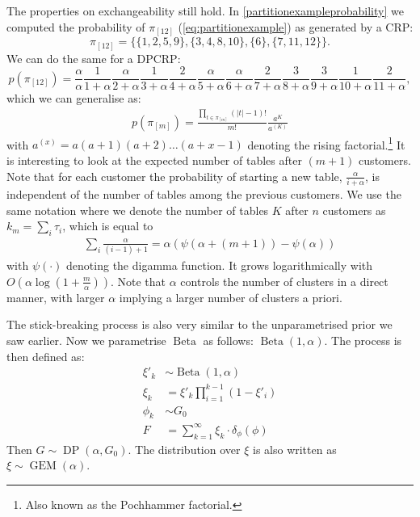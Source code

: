 The properties on exchangeability still hold. In \cref{partitionexampleprobability} we computed the probability of $\pi_{[12]}$ (\cref{eq:partitionexample}) as generated by a CRP:
\begin{equation}
	\pi_{[12]} = \{\{1,2,5,9\},\{3,4,8,10\},\{6\},\{7,11,12\}\}.
\end{equation}
We can do the same for a DPCRP:
\begin{equation}\label{eq:dppartitionexampleprobability}
	p(\pi_{[12]}) = \frac{\alpha}{\alpha}\frac{1}{1+\alpha}\frac{\alpha}{2+\alpha}\frac{1}{3+\alpha}\frac{2}{4+\alpha}\frac{\alpha}{5+\alpha}\frac{\alpha}{6+\alpha}\frac{2}{7+\alpha}\frac{3}{8+\alpha}\frac{3}{9+\alpha}\frac{1}{10+\alpha}\frac{2}{11+\alpha},
\end{equation}
which we can generalise as:
\begin{align}
	p(\pi_{[m]}) = \frac{\prod_{t\in\pi_{[m]}}(|t|-1)!}{m!} \frac{a^K}{a^{(K)}}
\end{align}
with $a^{(x)} = a(a+1)(a+2)\ldots(a+x-1)$ denoting the rising factorial.\footnote{Also known as the Pochhammer factorial.} It is interesting to look at the expected number of tables after $(m+1)$ customers. Note that for each customer the probability of starting a new table, $\frac{\alpha}{i+\alpha}$, is independent of the number of tables among the previous customers. We use the same notation where we denote the number of tables $K$ after $n$ customers as $k_m = \sum_i \tau_i$, which is equal to
\begin{align}
	\sum_i \frac{\alpha}{(i-1)+1} = \alpha(\psi(\alpha+(m+1))-\psi(\alpha))
\end{align}
with $\psi(\cdot)$ denoting the digamma function. It grows logarithmically with $O(\alpha \log(1+\frac{m}{\alpha}))$. Note that $\alpha$ controls the number of clusters in a direct manner, with larger $\alpha$ implying a larger number of clusters a priori.

The stick-breaking process is also very similar to the unparametrised prior we saw earlier. Now we parametrise $\operatorname{Beta}$ as follows: $\operatorname{Beta}(1,\alpha)$. The process is then defined as:
\begin{align}
	\xi'_k &\sim\operatorname{Beta}(1,\alpha) \\
    \xi_k &= \xi'_k \prod_{i=1}^{k-1}(1-\xi'_i) \\
    \phi_k&\sim G_0 \\
    F &= \sum_{k=1}^\infty \xi_k\cdot\delta_\phi(\phi)
\end{align}
Then $G\sim\operatorname{DP}(\alpha,G_0)$. The distribution over $\xi$ is also written as $\xi\sim\operatorname{GEM}(\alpha)$.

